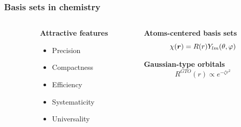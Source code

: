 \begin{frame}
    \frametitle{Basis sets in chemistry}
    \begin{columns}
    \begin{column}{.10\textwidth}
    \end{column}
    \begin{column}{.30\textwidth}
    \textbf{Attractive features}
    \begin{itemize}
        \item {\color{yellow} Precision}
        \item {\color{yellow} Compactness}
        \item {\color{green} Efficiency}
        \item {\color{yellow} Systematicity}
        \item {\color{red} Universality}
    \end{itemize}
    \end{column}
    \begin{column}{.60\textwidth}
    \centering
    \textbf{Atoms-centered basis sets}
    \begin{equation}
        \nonumber
        \chi(\boldsymbol r) = R(r)Y_{lm}(\theta,\varphi)
    \end{equation}

    \vspace{4.2mm}

    \textbf{Gaussian-type orbitals}
    \begin{equation}
        \nonumber
        R^{GTO}(r) \propto e^{-\zeta r^2}
    \end{equation}
    \end{column}
    \end{columns}

    \vspace{5mm}


\end{frame}
